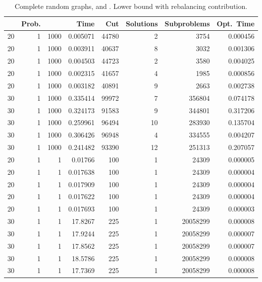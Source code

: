 \documentclass[a4paper,11pt]{article}
\begin{document}
\begin{table}
\begin{center}
\begin{tabular}{|rrr|r|r|rr|r|}
\hline
 & Prob. &  & Time & Cut & Solutions & Subproblems & Opt.\ Time \\
\hline
20 & 1 & 1000 & 0.005071 & 44780 & 2 & 3754 & 0.000456 \\
20 & 1 & 1000 & 0.003911 & 40637 & 8 & 3032 & 0.001306 \\
20 & 1 & 1000 & 0.004503 & 44723 & 2 & 3580 & 0.004025 \\
20 & 1 & 1000 & 0.002315 & 41657 & 4 & 1985 & 0.000856 \\
20 & 1 & 1000 & 0.003182 & 40891 & 9 & 2663 & 0.002738 \\
30 & 1 & 1000 & 0.335414 & 99972 & 7 & 356804 & 0.074178 \\
30 & 1 & 1000 & 0.324173 & 91583 & 9 & 344801 & 0.317206 \\
30 & 1 & 1000 & 0.259961 & 96494 & 10 & 283930 & 0.135704 \\
30 & 1 & 1000 & 0.306426 & 96948 & 4 & 334555 & 0.004207 \\
30 & 1 & 1000 & 0.241482 & 93390 & 12 & 251313 & 0.207057 \\
\hline
20 & 1 & 1 & 0.01766 & 100 & 1 & 24309 & 0.000005 \\
20 & 1 & 1 & 0.017638 & 100 & 1 & 24309 & 0.000004 \\
20 & 1 & 1 & 0.017909 & 100 & 1 & 24309 & 0.000004 \\
20 & 1 & 1 & 0.017622 & 100 & 1 & 24309 & 0.000004 \\
20 & 1 & 1 & 0.017693 & 100 & 1 & 24309 & 0.000003 \\
30 & 1 & 1 & 17.8267 & 225 & 1 & 20058299 & 0.000008 \\
30 & 1 & 1 & 17.9244 & 225 & 1 & 20058299 & 0.000007 \\
30 & 1 & 1 & 17.8562 & 225 & 1 & 20058299 & 0.000007 \\
30 & 1 & 1 & 18.5786 & 225 & 1 & 20058299 & 0.000008 \\
30 & 1 & 1 & 17.7369 & 225 & 1 & 20058299 & 0.000008 \\
\hline
\end{tabular}
\end{center}
\caption{Complete random graphs,  and . Lower
  bound with rebalancing contribution.}
\label{tab:complete-rebal}
\end{table}
\end{document}
